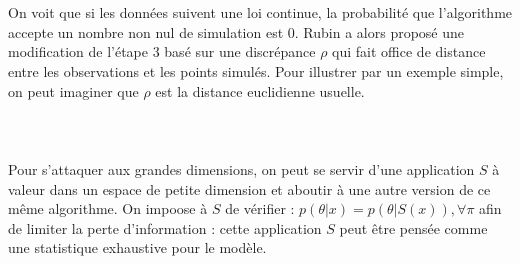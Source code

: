 \documentclass{article}
\theoremstyle{definition}
\begin{document}
\\
\\

On voit que si les données suivent une loi continue, la probabilité que l'algorithme accepte un nombre non nul de simulation est $0$. Rubin a alors proposé une modification de l'étape 3 basé sur une discrépance $\rho$ qui fait office de distance entre les observations et les points simulés. Pour illustrer par un exemple simple, on peut imaginer que $\rho$ est la distance euclidienne usuelle.\\
\\

\\
\\

Pour s'attaquer aux grandes dimensions, on peut se servir d'une application $S$ à valeur dans un espace de petite dimension et aboutir à une autre version de ce même algorithme. On impoose à $S$ de vérifier : $p(\theta|x)=p(\theta|S(x)),\forall \pi$ afin de limiter la perte d'information : cette application $S$ peut être pensée comme une statistique exhaustive pour le modèle.
\\

\\
\\
\end{document}
